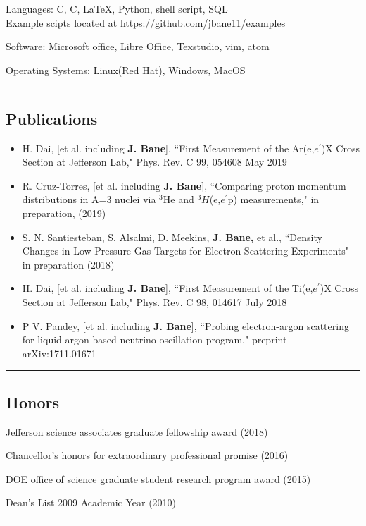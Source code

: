 \documentclass[12pt,letterpaper]{article}
\newenvironment{indentsection}[1]%
{\begin{list}{}%
	{\setlength{\leftmargin}{#1}}%
	\item[]%
}
{\end{list}}
\newcommand{\CPP}
{C\nolinebreak[4]\hspace{-.05em}\raisebox{.22ex}{\footnotesize\bf ++}}
\begin{document}
\begin{indentsection}{\parindent}
\begin{description*}
	\item[Languages:]
	C, \CPP, \LaTeX, Python, shell script, SQL \\
	Example scipts located at https://github.com/jbane11/examples
	\item[Software:]
	Microsoft office, Libre Office, Texstudio, vim, atom
	\item[Operating Systems:]
	Linux(Red Hat), Windows, MacOS
	
\end{description*}
\end{indentsection}
\hrule
\subsection*{Publications}
\begin{itemize} \itemsep -2pt %
	\item  H. Dai, [et al. including \textbf{J. Bane}], ``First Measurement of the Ar(e,$e^\prime$)X Cross Section at Jefferson Lab," Phys. Rev. C 99, 054608 May 2019
	\item R. Cruz-Torres, [et al. including \textbf{J. Bane}], ``Comparing proton momentum distributions in A=3 nuclei via $^3$He and $^3H$(e,$e^\prime$p) measurements," in preparation, (2019)
	\item S. N. Santiesteban, S. Alsalmi, D. Meekins, \textbf{J. Bane,} et al., ``Density Changes in Low Pressure Gas Targets for Electron Scattering Experiments" in preparation (2018) 
	
	\item  H. Dai, [et al. including \textbf{J. Bane}], ``First Measurement of the Ti(e,$e^\prime$)X Cross Section at Jefferson Lab," Phys. Rev. C 98, 014617 July 2018
	\item P V. Pandey, [et al. including \textbf{J. Bane}], ``Probing electron-argon scattering for liquid-argon based neutrino-oscillation program," preprint arXiv:1711.01671
	
\end{itemize}
\hrule
\subsection*{Honors}
	\begin{itemize*}
		\item Jefferson science associates graduate fellowship award (2018)  
		\item Chancellor’s honors for extraordinary professional promise (2016) 
		\item DOE office of science graduate student research program award (2015)
		\item Dean's List 2009 Academic Year (2010)
	\end{itemize*}
\hrule
\end{document}

